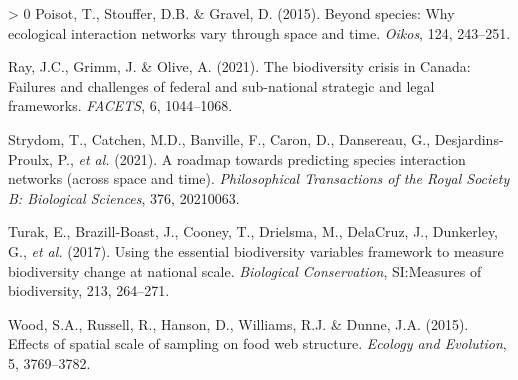 \documentclass[11pt]{article}
\newlength{\cslhangindent}
\newenvironment{CSLReferences}[3] %
 {%
  \setlength{\parindent}{0pt}
  \ifodd #1 \everypar{\setlength{\hangindent}{\cslhangindent}}\ignorespaces\fi
  \ifnum #2 > 0
  \setlength{\parskip}{#2\baselineskip}
  \fi
 }%
 {}
\begin{document}
\begin{CSLReferences}{1}{0}
\leavevmode\hypertarget{ref-Poisot2015SpeWhy}{}%
Poisot, T., Stouffer, D.B. \& Gravel, D. (2015). Beyond species: Why
ecological interaction networks vary through space and time.
\emph{Oikos}, 124, 243--251.

\leavevmode\hypertarget{ref-Ray2021BioCri}{}%
Ray, J.C., Grimm, J. \& Olive, A. (2021). The biodiversity crisis in
Canada: Failures and challenges of federal and sub-national strategic
and legal frameworks. \emph{FACETS}, 6, 1044--1068.

\leavevmode\hypertarget{ref-Strydom2021RoaPre}{}%
Strydom, T., Catchen, M.D., Banville, F., Caron, D., Dansereau, G.,
Desjardins-Proulx, P., \emph{et al.} (2021). A roadmap towards
predicting species interaction networks (across space and time).
\emph{Philosophical Transactions of the Royal Society B: Biological
Sciences}, 376, 20210063.

\leavevmode\hypertarget{ref-Turak2017UsiEss}{}%
Turak, E., Brazill-Boast, J., Cooney, T., Drielsma, M., DelaCruz, J.,
Dunkerley, G., \emph{et al.} (2017). Using the essential biodiversity
variables framework to measure biodiversity change at national scale.
\emph{Biological Conservation}, SI:Measures of biodiversity, 213,
264--271.

\leavevmode\hypertarget{ref-Wood2015EffSpa}{}%
Wood, S.A., Russell, R., Hanson, D., Williams, R.J. \& Dunne, J.A.
(2015). Effects of spatial scale of sampling on food web structure.
\emph{Ecology and Evolution}, 5, 3769--3782.

\end{CSLReferences}
\end{document}

